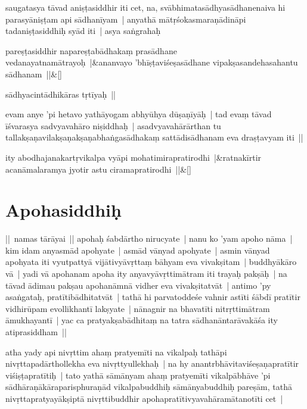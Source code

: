 \documentclass[article,12pt,a4paper]{memoir}
\begin{document}
	  \pstart saugatasya tāvad aniṣṭasiddhir iti cet, na, svābhimatasādhyasādhanenaiva hi parasyāniṣṭam api sādhanīyam | anyathā mātṛśokasmaraṇādināpi tadaniṣṭasiddhiḥ syād iti | asya saṅgrahaḥ
	\pend
      
	    
	    \stanza[\smallbreak]
	pareṣṭasiddhir napareṣṭabādhakaṃ prasādhane vedanayatnamātrayoḥ |&ananvayo 'bhīṣṭaviśeṣasādhane vipakṣasandehasahantu sādhanam ||\&[\smallbreak]


	\label{īsd-sādhyacintā}
	  
	

	  \pstart sādhyacintādhikāras tṛtīyaḥ ||
	\pend
      

	  \pstart evam anye 'pi hetavo yathāyogam abhyūhya dūṣaṇīyāḥ | tad evaṃ tāvad īśvarasya sadvyavahāro niṣiddhaḥ | asadvyavahārārthan tu tallakṣaṇavilakṣaṇakṣaṇabhaṅgasādhakaṃ sattādisādhanam eva draṣṭavyam iti ||\leavevmode{}\label{RNAms_32B1}
	\pend
      
	    
	    \stanza[\smallbreak]
	\label{thakur75-57.14}ity abodhajanakartṛvikalpa vyāpi mohatimirapratirodhi |&ratnakīrtir acanāmalaramya jyotir astu ciramapratirodhi ||\&[\smallbreak]


	
	  
	
\chapter[{Apohasiddhiḥ}]{Apohasiddhiḥ}\label{Apohasiddhiḥ}

	  \pstart || namas tārāyai || \label{thakur75-58.5} apohaḥ śabdārtho nirucyate | nanu ko 'yam apoho nāma | kim idam anyasmād apohyate | asmād vānyad apohyate | asmin vānyad apohyata iti vyutpattyā vijātivyāvṛttaṃ bāhyam eva vivakṣitam | buddhyākāro vā | yadi vā apohanam apoha ity anyavyāvṛttimātram iti trayaḥ pakṣāḥ | \label{thakur75-58.9} na tāvad ādimau pakṣau apohanāmnā vidher eva vivakṣitatvāt | antimo 'py asaṅgataḥ, pratītibādhitatvāt | tathā hi parvatoddeśe vahnir astīti śābdī pratītir vidhirūpam evollikhantī lakṣyate | nānagnir na bhavatīti nitrṛttimātram āmukhayantī | yac ca pratyakṣabādhitaṃ na tatra sādhanāntarāvakāśa ity atiprasiddham ||
	\pend
      

	  \pstart atha yady api nivṛttim ahaṃ pratyemīti na vikalpaḥ tathāpi nivṛttapadārthollekha eva nivṛttyullekhaḥ | na hy anantrbhāvitaviśeṣaṇapratītir viśiṣṭapratītiḥ | tato yathā sāmānyam ahaṃ pratyemīti vikalpābhāve 'pi sādhāraṇākāraparisphuraṇād vikalpabuddhiḥ sāmānyabuddhiḥ pareṣām, tathā nivṛttapratyayākṣiptā nivṛttibuddhir apohapratītivyavahāramātanotīti cet |
	\pend
      
\end{document}
